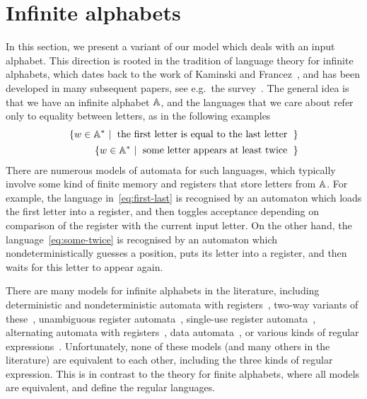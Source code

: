 \section{Infinite alphabets}
\label{sec:infinite-alphabets}


In this section, we present a variant of our model which deals with an input alphabet. This direction is rooted in the tradition of language theory for infinite alphabets, which dates back to the work of Kaminski and Francez~\cite{kaminskiFiniteMemoryAutomata1994}, and has been developed in many subsequent papers, see e.g.~the survey~\cite{bojanczykOrbitFiniteSetsTheir2017}. The general idea is that we have an infinite alphabet $\mathbb A$, and the languages that we care about refer only to equality between letters, as in the following examples
\begin{align}
\setbuild{ w \in \atoms^*}{the first letter is equal to the last letter}
\label{eq:first-last}
\\
\setbuild{ w \in \atoms^*}{some letter appears at least twice}
\label{eq:some-twice}
\end{align}
There are numerous models of automata for such languages, which typically involve some kind of finite memory and registers that store letters from $\mathbb A$. For example, the language in~\eqref{eq:first-last} is recognised by an automaton which loads the first letter into a register, and then toggles acceptance depending on comparison of the register with the current input letter. On the other hand, the language~\eqref{eq:some-twice} is recognised by an automaton which nondeterministically guesses a position, puts its letter into a register, and then waits for this letter to appear again. 

There are many models for infinite alphabets in the literature,  including deterministic and nondeterministic automata with registers~\cite[Section 2]{kaminskiFiniteMemoryAutomata1994}, two-way variants of these~\cite[Definition 2.1]{nevenFiniteStateMachines2004}, unambiguous register automata~\cite[Section 5]{colcombet2015unambiguity}, single-use register automata~\cite[Definition 3]{bojanczykstefanski2020}, alternating automata with registers~\cite[Section 2.5]{DBLP:journals/tocl/DemriL09}, data automata~\cite[Section 4.2]{bojanczykTwovariableLogicData2011}, or various kinds of regular expressions~\cite{regexpKaminskiTan2004,regexpLibkin2015,KleeneNominal2019}. Unfortunately, none of these models (and many others in the literature) are equivalent to each other, including the three kinds of regular expression. This is in contrast to the theory for finite alphabets, where all models are equivalent, and define the regular languages.

